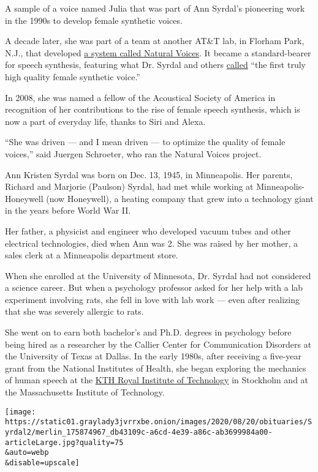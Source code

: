 A sample of a voice named Julia that was part of Ann Syrdal's pioneering
work in the 1990s to develop female synthetic voices.

A decade later, she was part of a team at another AT\&T lab, in Florham
Park, N.J., that developed
\href{https://www.nytimes3xbfgragh.onion/2001/08/09/technology/the-desktop-that-does-elvis.html}{a
system called Natural Voices}. It became a standard-bearer for speech
synthesis, featuring what Dr. Syrdal and others
\href{https://www.engineergirl.org/2939/Ann-Syrdal}{called} ``the first
truly high quality female synthetic voice.''

In 2008, she was named a fellow of the Acoustical Society of America in
recognition of her contributions to the rise of female speech synthesis,
which is now a part of everyday life, thanks to Siri and Alexa.

``She was driven --- and I mean driven --- to optimize the quality of
female voices,'' said Juergen Schroeter, who ran the Natural Voices
project.

Ann Kristen Syrdal was born on Dec. 13, 1945, in Minneapolis. Her
parents, Richard and Marjorie (Paulson) Syrdal, had met while working at
Minneapolis-Honeywell (now Honeywell), a heating company that grew into
a technology giant in the years before World War II.

Her father, a physicist and engineer who developed vacuum tubes and
other electrical technologies, died when Ann was 2. She was raised by
her mother, a sales clerk at a Minneapolis department store.

When she enrolled at the University of Minnesota, Dr. Syrdal had not
considered a science career. But when a psychology professor asked for
her help with a lab experiment involving rats, she fell in love with lab
work --- even after realizing that she was severely allergic to rats.

She went on to earn both bachelor's and Ph.D. degrees in psychology
before being hired as a researcher by the Callier Center for
Communication Disorders at the University of Texas at Dallas. In the
early 1980s, after receiving a five-year grant from the National
Institutes of Health, she began exploring the mechanics of human speech
at the \href{https://www.kth.se/en}{KTH Royal Institute of Technology}
in Stockholm and at the Massachusetts Institute of Technology.

\texttt{[image: https://static01.graylady3jvrrxbe.onion/images/2020/08/20/obituaries/Syrdal2/merlin\_175874967\_db43109c-a6cd-4e39-a86c-ab3699984a00-articleLarge.jpg?quality=75\\\&auto=webp\\\&disable=upscale]}


